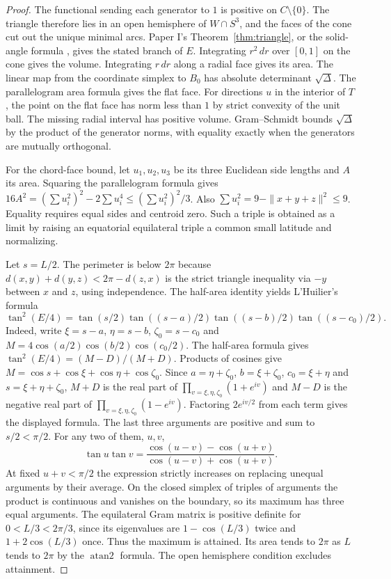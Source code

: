 \documentclass[11pt,reqno]{amsart}
\theoremstyle{definition}
\theoremstyle{remark}
\numberwithin{equation}{section}
\begin{document}
\begin{proof}
The functional sending each generator to $1$ is positive on $C\setminus
\{0\}$. The triangle therefore lies in an open hemisphere of $W\cap S^3$,
and the faces of the cone cut out the unique minimal arcs. Paper I's
Theorem~\ref{thm:triangle}, or the solid-angle formula
\cite{VOS,Eriksson}, gives the stated branch of $E$.
Integrating $r^2\,dr$ over $[0,1]$ on the cone gives the volume.
Integrating $r\,dr$ along a radial face gives its area. The linear map
from the coordinate simplex to $B_0$ has absolute determinant
$\sqrt\Delta$. The parallelogram area formula gives the flat face.
For directions $u$ in the interior of $T$, the point on the flat face
has norm less than $1$ by strict convexity of the unit ball. The missing
radial interval has positive volume. Gram--Schmidt bounds $\sqrt\Delta$
by the product of the generator norms, with equality exactly when the
generators are mutually orthogonal.

For the chord-face bound, let $u_1,u_2,u_3$ be its three Euclidean
side lengths and $A$ its area. Squaring the parallelogram formula gives
$16A^2=(\sum u_i^2)^2-2\sum u_i^4\le(\sum u_i^2)^2/3$.
Also $\sum u_i^2=9-\|x+y+z\|^2\le9$. Equality requires equal sides
and centroid zero. Such a triple is obtained as a limit by raising an
equatorial equilateral triple a common small latitude and normalizing.

Let $s=L/2$. The perimeter is below $2\pi$ because
$d(x,y)+d(y,z)<2\pi-d(z,x)$ is the strict triangle inequality via
$-y$ between $x$ and $z$, using independence. The half-area identity yields L'Huilier's formula
\[
 \tan^2(E/4)=\tan(s/2)
   \tan((s-a)/2)\tan((s-b)/2)\tan((s-c_0)/2).
\]
Indeed, write $\xi=s-a$, $\eta=s-b$, $\zeta_0=s-c_0$ and
$M=4\cos(a/2)\cos(b/2)\cos(c_0/2)$. The half-area formula gives
$\tan^2(E/4)=(M-D)/(M+D)$. Products of cosines give
$M=\cos s+\cos\xi+\cos\eta+\cos\zeta_0$. Since $a=\eta+\zeta_0$,
$b=\xi+\zeta_0$, $c_0=\xi+\eta$ and $s=\xi+\eta+\zeta_0$,
$M+D$ is the real part of $\prod_{v=\xi,\eta,\zeta_0}(1+e^{iv})$
and $M-D$ is the negative real part of $\prod_{v=\xi,\eta,\zeta_0}
(1-e^{iv})$. Factoring $2e^{iv/2}$ from each term gives the displayed
formula. The last three arguments are positive and sum to $s/2<\pi/2$.
For any two of them, $u,v$,
\[
 \tan u\tan v=\frac{\cos(u-v)-\cos(u+v)}
                    {\cos(u-v)+\cos(u+v)}.
\]
At fixed $u+v<\pi/2$ the expression strictly increases on replacing
unequal arguments by their average. On the closed simplex of triples
of arguments the product is continuous and vanishes on the boundary,
so its maximum has three equal arguments. The equilateral Gram matrix
is positive definite for $0<L/3<2\pi/3$, since its eigenvalues are
$1-\cos(L/3)$ twice and $1+2\cos(L/3)$ once. Thus the maximum is
attained. Its area tends to $2\pi$ as $L$ tends to $2\pi$ by the
$\operatorname{atan2}$ formula. The open hemisphere condition excludes
attainment.
\end{proof}
\end{document}
